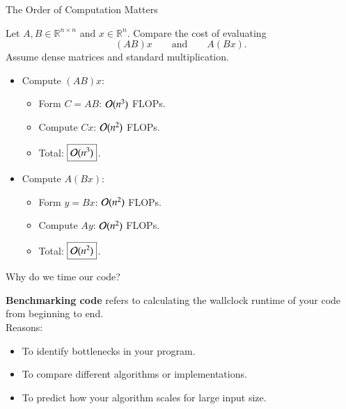 \documentclass[10pt]{beamer}
\begin{document}
\begin{frame}[shrink]{The Order of Computation Matters}

\begin{example}
Let $A,B\in\mathbb{R}^{n\times n}$ and
$x\in\mathbb{R}^n$. Compare the cost of evaluating
\[
    (AB)x
    \qquad \text{and} \qquad
    A(Bx).
\]
Assume dense matrices and standard multiplication.
\end{example}

\begin{itemize}
    \item<2-> Compute $(AB)x$:
    \begin{itemize}
        \item Form $C=AB$: ${\mathcal{O}}(n^3)$ FLOPs.
        \item Compute $Cx$: ${\mathcal{O}}(n^2)$ FLOPs.
        \item Total: $\boxed{{\mathcal{O}}(n^3)}$.
    \end{itemize}

    \vfill

    \item<3-> Compute $A(Bx)$:
    \begin{itemize}
        \item Form $y=Bx$: ${\mathcal{O}}(n^2)$ FLOPs.
        \item Compute $Ay$: ${\mathcal{O}}(n^2)$ FLOPs.
        \item Total: $\boxed{{\mathcal{O}}(n^2)}$.
    \end{itemize}
\end{itemize}


\end{frame}


\begin{frame}{Why do we time our code?}

    \textbf{Benchmarking code} refers to calculating the wallclock runtime of your code from beginning to end.\\[5mm]

    Reasons:\\[3mm]
    \begin{itemize}
        \item To identify bottlenecks in your program.
        \item To compare different algorithms or implementations.
        \item To predict how your algorithm scales for large input size.
    \end{itemize}
\end{frame}
\end{document}
